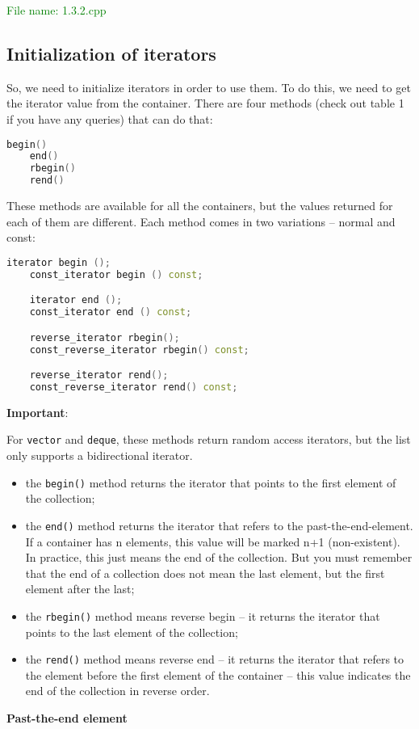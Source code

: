 \textcolor{green}{File name: 1.3.2.cpp}


\subsection{Initialization of iterators} %
So, we need to initialize iterators in order to use them. To do this, we need to get the iterator value 
from the container. There are four methods (check out table 1 if you have any queries) that can do that:
\begin{lstlisting}[language=C++]
    begin()
    end()
    rbegin()
    rend()
\end{lstlisting}
These methods are available for all the containers, but the values returned for each of them are different. 
Each method comes in two variations – normal and const:
\begin{lstlisting}[language=C++]
    iterator begin ();
    const_iterator begin () const;

    iterator end ();
    const_iterator end () const;

    reverse_iterator rbegin();
    const_reverse_iterator rbegin() const;

    reverse_iterator rend();
    const_reverse_iterator rend() const;
\end{lstlisting}
\textbf{Important}:

For \texttt{vector} and \texttt{deque}, these methods return random access iterators, but the list only 
supports a bidirectional iterator.
\begin{itemize}
    \item the \texttt{begin()} method returns the iterator that points to the first element of the collection;
    \item the \texttt{end()} method returns the iterator that refers to the past-the-end-element. If a container 
      has n elements, this value will be marked n+1 (non-existent). In practice, this just means the end of 
      the collection. But you must remember that the end of a collection does not mean the last element, 
      but the first element after the last;
    \item the \texttt{rbegin()} method means reverse begin – it returns the  iterator that points to the 
      last element of the collection;
    \item the \texttt{rend()} method means reverse end – it returns the iterator that refers to the element 
      before the first element of the container – this value indicates the end of the collection in reverse order.
\end{itemize}
\textbf{Past-the-end element}

